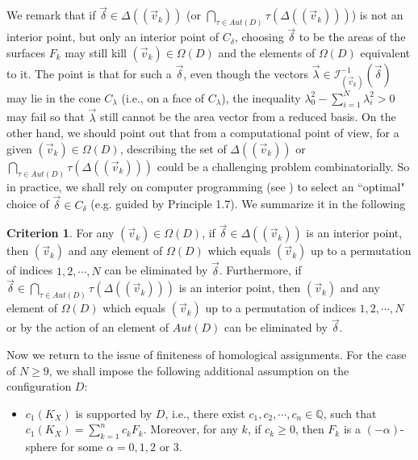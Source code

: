 \documentclass[11pt]{amsart}
\theoremstyle{plain}
\numberwithin{theorem}{section}
\theoremstyle{definition}
\newtheorem{criterion}[theorem]{Criterion}
\newcommand{\Q}{{\mathbb Q}}
\newcommand{\I}{{\mathcal I}}
\begin{document}
We remark that if $\vec{\delta}\in \Delta((\vec{v}_k))$ (or $\bigcap_{\tau\in Aut(D)} \tau(\Delta((\vec{v}_k)))$) 
is not an interior point, but only an interior point of $C_\delta$, choosing $\vec{\delta}$ to be the areas of the surfaces $F_k$ may still kill $(\vec{v}_k)\in\Omega(D)$ and the elements of $\Omega(D)$ equivalent to it.
The point is that for such a $\vec{\delta}$, even though the vectors 
$\vec{\lambda}\in \I_{(\vec{v}_k)}^{-1}(\vec{\delta})$ may lie in the cone $C_\lambda$ (i.e., on a face of $C_\lambda$), the inequality $\lambda_0^2-\sum_{i=1}^N \lambda_i^2>0$ may fail so that $\vec{\lambda}$ 
still cannot be the area vector from a reduced basis. On the other hand, we should point out that from a computational point of view, for a given $(\vec{v}_k)\in\Omega(D)$, describing the set of $\Delta((\vec{v}_k))$ or 
$\bigcap_{\tau\in Aut(D)} \tau(\Delta((\vec{v}_k)))$ could be a challenging problem combinatorially. So in
practice, we shall rely on computer programming (see \cite{CGM}) to select an ``optimal" choice of 
$\vec{\delta}\in C_\delta$ (e.g. guided by Principle 1.7). We summarize it in the following 

\begin{criterion}
For any $(\vec{v}_k)\in \Omega(D)$, if $\vec{\delta}\in \Delta((\vec{v}_k))$ is an interior point, then $(\vec{v}_k)$ and any element of $\Omega(D)$ which equals $(\vec{v}_k)$ up to a permutation of indices $1,2, \cdots,N$ can be eliminated by $\vec{\delta}$. Furthermore, if $\vec{\delta}\in \bigcap_{\tau\in Aut(D)} \tau(\Delta((\vec{v}_k)))$ is an interior point, then $(\vec{v}_k)$ and any element of $\Omega(D)$ which equals $(\vec{v}_k)$ up to a permutation of indices $1,2, \cdots,N$ or by the action of an element of $Aut(D)$ can be eliminated by $\vec{\delta}$. 
\end{criterion}

Now we return to the issue of finiteness of homological assignments. For the case of $N\geq 9$, we shall impose the following additional assumption on the configuration $D$: 
\begin{itemize}
\item [{(*)}] $c_1(K_X)$ is supported by $D$, i.e., there exist $c_1,c_2,\cdots,c_n\in\Q$, 
such that $c_1(K_X)=\sum_{k=1}^n c_k F_k$. Moreover, for any $k$, if $c_k\geq 0$, then $F_k$ is a
$(-\alpha)$-sphere for some $\alpha=0,1,2$ or $3$.
\end{itemize}
\end{document}
